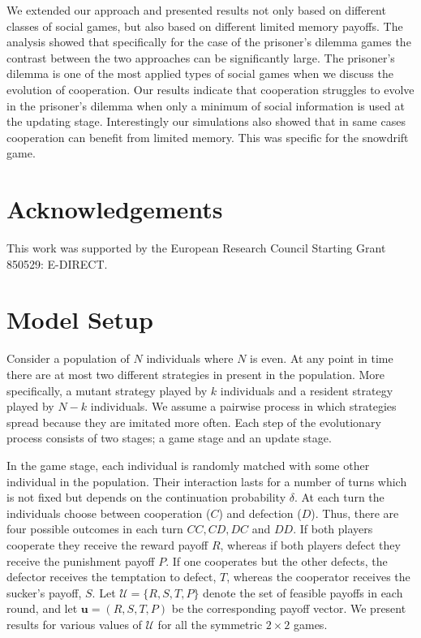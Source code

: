 \documentclass[11pt]{article}
\theoremstyle{plainCl1}
\theoremstyle{plainCl2}
\begin{document}
We extended our approach and presented results not only based on different
classes of social games, but also based on different limited memory payoffs. The
analysis showed that specifically for the case of the prisoner's dilemma games
the contrast between the two approaches can be significantly large. The
prisoner's dilemma is one of the most applied types of social games when we
discuss the evolution of cooperation. Our results indicate that cooperation
struggles to evolve in the prisoner's dilemma when only a minimum of social
information is used at the updating stage. Interestingly our simulations also
showed that in same cases cooperation can benefit from limited memory. This was
specific for the snowdrift game.

\section{Acknowledgements}

This work was supported by the European Research Council Starting Grant 850529:
E-DIRECT.


\appendix

\section{Model Setup}\label{appendix:methods}

Consider a population of \(N\) individuals where \(N\) is even. At any point in
time there are at most two different strategies in present in the population.
More specifically, a mutant strategy played by \(k\) individuals and a resident
strategy played by \(N - k\) individuals. We assume a pairwise process in which
strategies spread because they are imitated more often. Each step of the
evolutionary process consists of two stages; a game stage and an update stage.

In the game stage, each individual is randomly matched with some other
individual in the population. Their interaction lasts for a number of turns
which is not fixed but depends on the continuation probability \(\delta\). At
each turn the individuals choose between cooperation (\(C\)) and defection
(\(D\)). Thus, there are four possible outcomes in each turn \(CC, CD, DC\) and
\(DD\). If both players cooperate they receive the reward payoff \(R\), whereas
if both players defect they receive the punishment payoff \(P\). If one
cooperates but the other defects, the defector receives the temptation to
defect, \(T\), whereas the cooperator receives the sucker's payoff, \(S\). Let
$\mathcal{U}=\{R,S,T,P\}$ denote the set of feasible payoffs in each round, and
let $\mathbf{u}\!=\!(R,S,T,P)$ be the corresponding payoff vector. We present
results for various values of $\mathcal{U}$ for all the symmetric \(2 \times 2\)
games.
\end{document}
